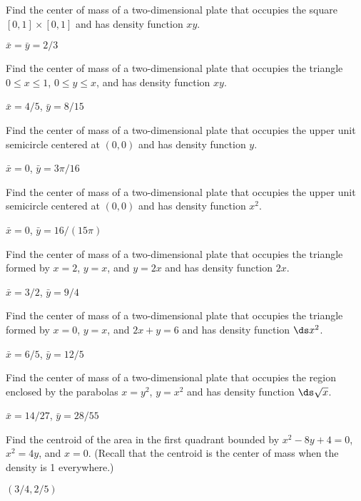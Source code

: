 \begin{exercises}

\exercise Find the center of mass of a two-dimensional plate 
that occupies the square $[0,1]\times[0,1]$
and has density
function $xy$.
\begin{answer} $\bar x=\bar y=2/3$
\end{answer}

\exercise Find the center of mass of a two-dimensional plate 
that occupies the triangle $0\le x\le1$, $0\le y\le x$,
and has density
function $xy$.
\begin{answer} $\bar x=4/5$, $\bar y=8/15$
\end{answer}

\exercise Find the center of mass of a two-dimensional plate 
that occupies the upper unit semicircle centered at $(0,0)$
and has density
function $y$.
\begin{answer} $\bar x=0$, $\bar y=3\pi/16$
\end{answer}

\exercise Find the center of mass of a two-dimensional plate 
that occupies the upper unit semicircle centered at $(0,0)$
and has density
function $x^2$.
\begin{answer} $\bar x=0$, $\bar y=16/(15\pi)$
\end{answer}

\exercise Find the center of mass of a two-dimensional plate 
that occupies the triangle formed by $x=2$, $y=x$, and $y=2x$
and has density
function $2x$.
\begin{answer} $\bar x=3/2$, $\bar y=9/4$
\end{answer}

\exercise Find the center of mass of a two-dimensional plate 
that occupies the triangle formed by $x=0$, $y=x$, and $2x+y=6$
and has density
function $\ds x^2$.
\begin{answer} $\bar x=6/5$, $\bar y=12/5$
\end{answer}

\exercise Find the center of mass of a two-dimensional plate 
that occupies the region enclosed by the parabolas $x=y^2$, $y=x^2$
and has density
function $\ds\sqrt{x}$.
\begin{answer} $\bar x=14/27$, $\bar y=28/55$
\end{answer}

\exercise Find the centroid of the area in the first quadrant bounded by
 $x^2-8y+4=0$, $x^2=4y$, and $x=0$. (Recall that the centroid
is the center of mass when the density is 1 everywhere.)
\begin{answer} $(3/4,2/5)$
\end{answer}


\end{exercises}
